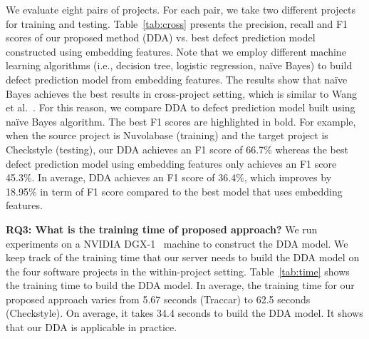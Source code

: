 We evaluate eight pairs of projects. For each pair, we take two different projects for training and testing. Table~\ref{tab:cross} presents the precision, recall and F1 scores of our proposed method (DDA) vs. best defect prediction model constructed using embedding features. Note that we employ different machine learning algorithms (i.e., decision tree, logistic regression, na\"{i}ve Bayes) to build defect prediction model from embedding features. The results show that na\"{i}ve Bayes achieves the best results in cross-project setting, which is similar to Wang et al.~\cite{wang2016automatically}. For this reason, we compare DDA to defect prediction model built using na\"{i}ve Bayes algorithm.
The best F1 scores are highlighted in bold. For example, when the source project is Nuvolabase (training) and the target project is Checkstyle (testing), our DDA achieves an F1 score of 66.7\% whereas the best defect prediction model using embedding features only achieves an F1 score 45.3\%. In average, DDA achieves an F1 score of 36.4\%, which improves by 18.95\% in term of F1 score compared to the best model that uses embedding features. 

\textbf{RQ3: What is the training time of proposed approach?}
We run experiments on a NVIDIA DGX-1~\cite{nvidia} machine to construct the DDA model. 
We keep track of the training time that our server needs to build the DDA model on the four software projects in the within-project setting. 
Table~\ref{tab:time} shows the training time to build the DDA model. In average, the training time for our proposed approach varies from 5.67 seconds (Traccar) to 62.5 seconds (Checkstyle). On average, it takes 34.4 seconds to build the DDA model. It shows that our DDA is applicable in practice.


